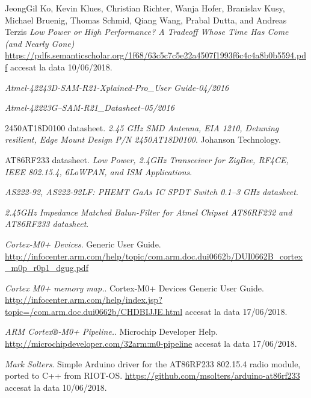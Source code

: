 \documentclass[12pt,a4paper]{report}
\begin{document}
\begin{thebibliography}{9}
JeongGil Ko, Kevin Klues, Christian Richter, Wanja Hofer, Branislav Kusy, Michael Bruenig, Thomas Schmid, Qiang Wang, Prabal Dutta, and Andreas Terzis
\textit{Low Power or High Performance? A Tradeoff Whose Time Has Come (and Nearly Gone)}\\
\href{https://pdfs.semanticscholar.org/1f68/63c5c7c5e22a4507f1993f6c4c4a8b0b5594.pdf}{https://pdfs.semanticscholar.org/1f68/63c5c7c5e22a4507f1993f6c4c4a8b0b5594.pdf} accesat la data 10/06/2018.

\textit{Atmel-42243D-SAM-R21-Xplained-Pro\_User Guide-04/2016}

\textit{Atmel-42223G–SAM-R21\_Datasheet–05/2016}

2450AT18D0100 datasheet. 
\textit{2.45 GHz SMD Antenna, EIA 1210, Detuning resilient, Edge Mount Design P/N 2450AT18D0100}.
Johanson Technology.

AT86RF233 datasheet. 
\textit{Low Power, 2.4GHz Transceiver for ZigBee, RF4CE, IEEE 802.15.4, 6LoWPAN, and ISM Applications}.

\textit{AS222-92, AS222-92LF: PHEMT GaAs IC SPDT Switch 0.1–3 GHz datasheet}.

\textit{2.45GHz Impedance Matched Balun-Filter for Atmel Chipset AT86RF232 and AT86RF233 datasheet}.

\textit{Cortex-M0+ Devices}.
Generic User Guide.
\href{http://infocenter.arm.com/help/topic/com.arm.doc.dui0662b/DUI0662B\_cortex\_m0p\_r0p1\_dgug.pdf}{http://infocenter.arm.com/help/topic/com.arm.doc.dui0662b/DUI0662B\_cortex\_m0p\_r0p1\_dgug.pdf}

\textit{Cortex M0+ memory map.}.
Cortex-M0+ Devices Generic User Guide. 
\href{http://infocenter.arm.com/help/index.jsp?topic=/com.arm.doc.dui0662b/CHDBIJJE.html}{http://infocenter.arm.com/help/index.jsp?topic=/com.arm.doc.dui0662b/CHDBIJJE.html} accesat la data 17/06/2018.

\textit{ARM Cortex®-M0+ Pipeline.}.
Microchip Developer Help.
\href{http://microchipdeveloper.com/32arm:m0-pipeline}{http://microchipdeveloper.com/32arm:m0-pipeline} accesat la data 17/06/2018.

\textit{Mark Solters}.
Simple Arduino driver for the AT86RF233 802.15.4 radio module, ported to C++ from RIOT-OS.
\href{https://github.com/msolters/arduino-at86rf233}{https://github.com/msolters/arduino-at86rf233} accesat la data 10/06/2018.

\end{thebibliography}
\end{document}
